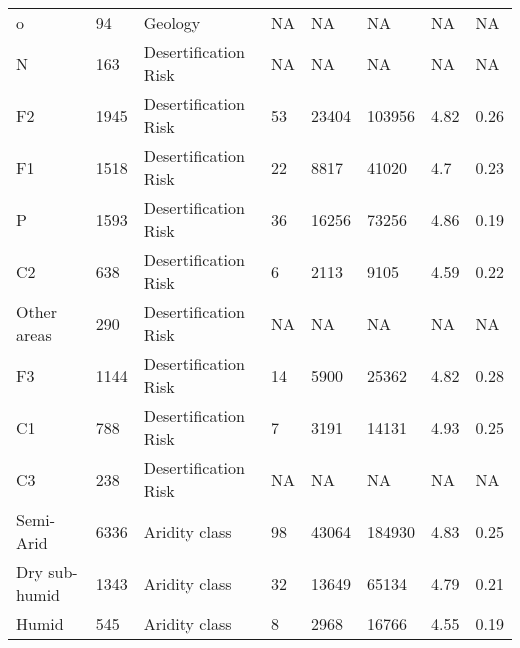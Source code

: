 \documentclass[unnumsec,webpdf,contemporary,large]{oup-authoring-template}%
\theoremstyle{thmstyleone}%
\theoremstyle{thmstyletwo}%
\theoremstyle{thmstylethree}%
\begin{document}
\begin{sidewaystable*}
\begin{tabular*}{\textwidth}{@{\extracolsep{\fill}}llllllll@{\extracolsep{\fill}}}
o                                               & 94   & Geology              & NA      & NA             & NA            & NA            & NA          \\
N                                               & 163  & Desertification Risk & NA      & NA             & NA            & NA            & NA          \\
F2                                              & 1945 & Desertification Risk & 53      & 23404          & 103956        & 4.82          & 0.26        \\
F1                                              & 1518 & Desertification Risk & 22      & 8817           & 41020         & 4.7           & 0.23        \\
P                                               & 1593 & Desertification Risk & 36      & 16256          & 73256         & 4.86          & 0.19        \\
C2                                              & 638  & Desertification Risk & 6       & 2113           & 9105          & 4.59          & 0.22        \\
Other areas                                     & 290  & Desertification Risk & NA      & NA             & NA            & NA            & NA          \\
F3                                              & 1144 & Desertification Risk & 14      & 5900           & 25362         & 4.82          & 0.28        \\
C1                                              & 788  & Desertification Risk & 7       & 3191           & 14131         & 4.93          & 0.25        \\
C3                                              & 238  & Desertification Risk & NA      & NA             & NA            & NA            & NA          \\
Semi-Arid                                       & 6336 & Aridity class        & 98      & 43064          & 184930        & 4.83          & 0.25        \\
Dry sub-humid                                   & 1343 & Aridity class        & 32      & 13649          & 65134         & 4.79          & 0.21        \\
Humid                                           & 545  & Aridity class        & 8       & 2968           & 16766         & 4.55          & 0.19       
\end{tabular*}
\end{sidewaystable*}
\end{document}
